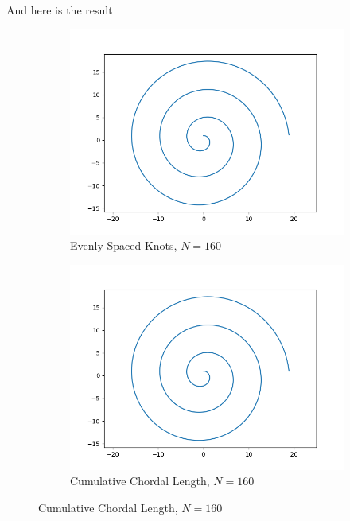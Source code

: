 \documentclass[a4paper]{article}
\begin{document}
And here is the result
\begin{figure}[H]
    \centering
    \begin{subfigure}[b]{0.45\textwidth}
        \centering
        \includegraphics[width=\textwidth]{../figure/E_2_B160.png}
        \caption{Evenly Spaced Knots, $N=160$}
    \end{subfigure}
    \begin{subfigure}[b]{0.45\textwidth}
        \centering
        \includegraphics[width=\textwidth]{../figure/E_2_cum_B160.png}
        \caption{Cumulative Chordal Length, $N=160$}
    \end{subfigure}
\end{figure}
\end{document}
